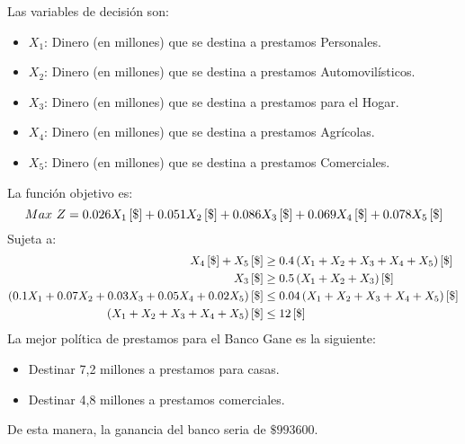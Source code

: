 \documentclass{tarea}
\begin{document}
\begin{homeworkProblem}
Las variables de decisión son:
\begin{itemize}
	\item  $X_1$: Dinero (en millones) que se destina a prestamos Personales.
	\item  $X_2$: Dinero (en millones) que se destina a prestamos Automovilísticos.
	\item  $X_3$: Dinero (en millones) que se destina a prestamos para el Hogar.
	\item  $X_4$: Dinero (en millones) que se destina a prestamos Agrícolas.
	\item  $X_5$: Dinero (en millones) que se destina a prestamos Comerciales.
\end{itemize}
La función objetivo es: 
\begin{equation}
	Max\ Z = 0.026X_1\left[ \$ \right] +0.051X_2\left[ \$ \right] + 0.086X_3\left[ \$ \right] + 0.069X_4\left[ \$ \right] + 0.078X_5\left[ \$ \right]
\end{equation}
Sujeta a:
\begin{align*}
	X_4\left[ \$ \right] + X_5\left[ \$ \right] &\ge 0.4\left( X_1 + X_2 + X_3 + X_4 +X_5 \right)\left[ \$ \right] \\
	X_3\left[ \$ \right] &\ge 0.5\left( X_1 + X_2 + X_3 \right)\left[ \$ \right]\\
	\left( 0.1X_1 + 0.07X_2 + 0.03X_3 + 0.05X_4 + 0.02X_5 \right)\left[ \$ \right] &\le 0.04\left( X_1 + X_2 + X_3+X_4 +X_5 \right)\left[ \$ \right] \\
	\left( X_1 + X_2 + X_3 +X_4 +X_5 \right)\left[ \$ \right] &\le 12\left[ \$ \right]
\end{align*}
La mejor política de prestamos para el Banco Gane es la siguiente:
\begin{itemize}
	\item Destinar 7,2 millones a prestamos para casas.
	\item Destinar 4,8 millones a prestamos comerciales.
\end{itemize}
De esta manera, la ganancia del banco seria de $\$993600$.
\end{homeworkProblem}
\end{document}
